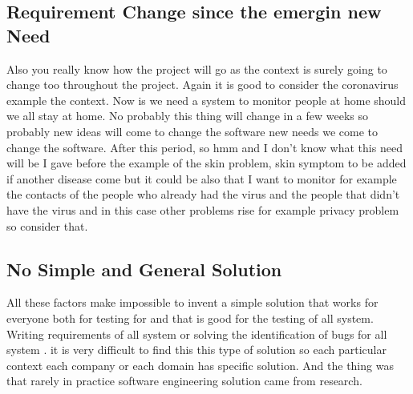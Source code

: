 \documentclass[conference, compsoc, twoside]{IEEEtran}
\begin{document}
\subsection{Requirement Change since the emergin new Need} %
\label{sub:requirement_change_as_new_need}

Also you really know how the project will go as the context is surely going to change too throughout the project. 
Again it is good to consider the coronavirus example the context. 
Now is we need a system to monitor people at home should we all stay at home.
No probably this thing will change in a few weeks so probably new ideas will come to change the software new needs we come to change the software. 
After this period, so hmm and I don't know what this need will be I gave before the example of the skin problem, skin symptom to be added if another disease come but it could be also that I want to monitor 
for example the contacts of the people who already had the virus and the people that didn't have the virus and in this case other problems rise 
for example privacy problem so consider that.

\subsection{No Simple and General Solution} %
\label{sub:no_simple_and_general_solution}
All these factors make impossible to invent a simple solution that works for everyone both for testing for and that is good for the testing of all system. 
Writing requirements of all system or solving the identification of bugs for all system .
it is very difficult to find this this type of solution so each particular context each company or each domain has specific solution.
And the thing was that rarely in practice software engineering solution came from research. 
\end{document}
